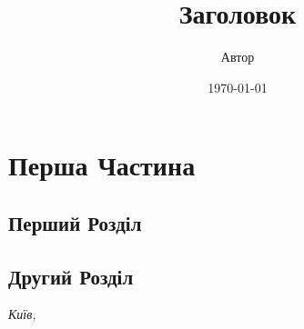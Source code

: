 \documentclass[a4paper,12pt,headsepline,titlepage,normalheadings,DIVcalc,draft]{book}
\title{Заголовок}
\author{Автор}
\date{\today}
\begin{document}

\maketitle

\tableofcontents

\setcounter{page}{1}

\part{Перша Частина}

\chapter{Перший Розділ}

\lipsum[1]

\lipsum[2]

\lipsum[3]

\lipsum[4]

\chapter{Другий Розділ}

\lipsum[5]

\lipsum[6]

\newpage

\mbox{}
\vfill
\begin{flushright}
\textit{Київ, \the\year}
\end{flushright}
\end{document}
